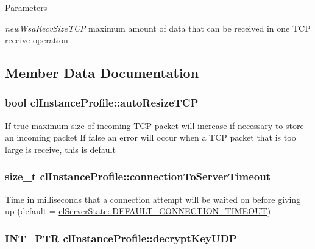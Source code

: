 \begin{DoxyParams}{Parameters}
\item[{\em newWsaRecvSizeTCP}]maximum amount of data that can be received in one TCP receive operation \end{DoxyParams}


\subsection{Member Data Documentation}
\hypertarget{classcl_instance_profile_a2f0358eb3bcd10a5dfa0ccca55afbf4a}{
\subsubsection[{autoResizeTCP}]{\setlength{\rightskip}{0pt plus 5cm}bool {\bf clInstanceProfile::autoResizeTCP}}}
\label{classcl_instance_profile_a2f0358eb3bcd10a5dfa0ccca55afbf4a}
If true maximum size of incoming TCP packet will increase if necessary to store an incoming packet If false an error will occur when a TCP packet that is too large is receive, this is default \hypertarget{classcl_instance_profile_a555a74500b6b0e6cc660e8f3e1180d8f}{
\subsubsection[{connectionToServerTimeout}]{\setlength{\rightskip}{0pt plus 5cm}size\_\-t {\bf clInstanceProfile::connectionToServerTimeout}}}
\label{classcl_instance_profile_a555a74500b6b0e6cc660e8f3e1180d8f}
Time in milliseconds that a connection attempt will be waited on before giving up (default = \hyperlink{classcl_server_state_aa61be479aa559af84ebad2a136c2173b}{clServerState::DEFAULT\_\-CONNECTION\_\-TIMEOUT}) \hypertarget{classcl_instance_profile_ace072043f8984052fd263bcfecc73e4e}{
\subsubsection[{decryptKeyUDP}]{\setlength{\rightskip}{0pt plus 5cm}INT\_\-PTR {\bf clInstanceProfile::decryptKeyUDP}}}
